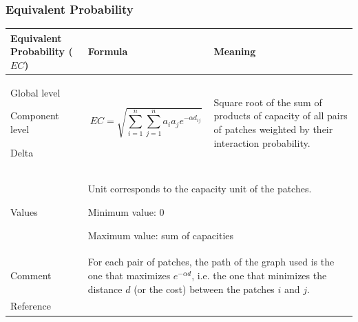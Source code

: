 \documentclass{article}
\begin{document}
\subsubsection{Equivalent Probability}
\label{metric_EC}
\begin{table}[H]
\begin{tabular}{|m{3.24cm}|m{4.4810004cm}m{7.924cm}|}
\hline
Equivalent Probability ($EC$) &
\multicolumn{1}{m{4.4810004cm}|}{Formula} &
Meaning\\\hline
Global level 

Component level

Delta &
\multicolumn{1}{m{4.4810004cm}|}{\begin{equation*}
\mathit{EC}=\sqrt{\sum _{i=1}^{n}{\sum _{j=1}^{n}{{a}_{i}}}{{a}_{j}e}^{-\alpha {d}_{\mathit{ij}}}}
\end{equation*}
} &
Square root of the sum of products of capacity of all pairs of patches weighted by their interaction probability. \\\hline
Values &
\multicolumn{2}{m{12.6050005cm}|}{Unit corresponds to the capacity unit of the patches.
	
Minimum value: 0

Maximum value: sum of capacities
}\\\hline
Comment &
\multicolumn{2}{m{12.6050005cm}|}{For each pair of patches, the path of
the graph used is the one that maximizes ${e}^{-\mathit{\alpha d}}$,
i.e. the one that minimizes the distance $d$ (or the cost) between the
patches $i$ and $j$.

}\\\hline
Reference &
\multicolumn{2}{m{12.6050005cm}|}{
\cite{Saura2011}
}\\\hline
\end{tabular}
\end{table}
\end{document}
